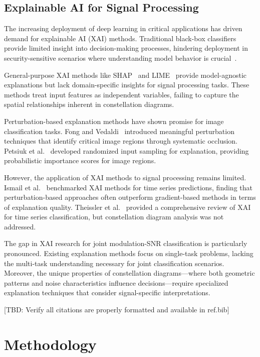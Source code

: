 \documentclass{ELSP}
\begin{document}
\subsection{Explainable AI for Signal Processing}

The increasing deployment of deep learning in critical applications has driven demand for explainable AI (XAI) methods. Traditional black-box classifiers provide limited insight into decision-making processes, hindering deployment in security-sensitive scenarios where understanding model behavior is crucial~\cite{arrieta2020explainable,adadi2018peeking}.

General-purpose XAI methods like SHAP~\cite{lundberg2017shap} and LIME~\cite{ribeiro2016lime} provide model-agnostic explanations but lack domain-specific insights for signal processing tasks. These methods treat input features as independent variables, failing to capture the spatial relationships inherent in constellation diagrams.

Perturbation-based explanation methods have shown promise for image classification tasks. Fong and Vedaldi~\cite{fong2017interpretable} introduced meaningful perturbation techniques that identify critical image regions through systematic occlusion. Petsiuk et al.~\cite{petsiuk2018rise} developed randomized input sampling for explanation, providing probabilistic importance scores for image regions.

However, the application of XAI methods to signal processing remains limited. Ismail et al.~\cite{ismail2020benchmarking} benchmarked XAI methods for time series predictions, finding that perturbation-based approaches often outperform gradient-based methods in terms of explanation quality. Theissler et al.~\cite{theissler2022explainable} provided a comprehensive review of XAI for time series classification, but constellation diagram analysis was not addressed.

The gap in XAI research for joint modulation-SNR classification is particularly pronounced. Existing explanation methods focus on single-task problems, lacking the multi-task understanding necessary for joint classification scenarios. Moreover, the unique properties of constellation diagrams—where both geometric patterns and noise characteristics influence decisions—require specialized explanation techniques that consider signal-specific interpretations.

[TBD: Verify all citations are properly formatted and available in ref.bib]

\section{Methodology}
\label{sec:methodology}
\end{document}
